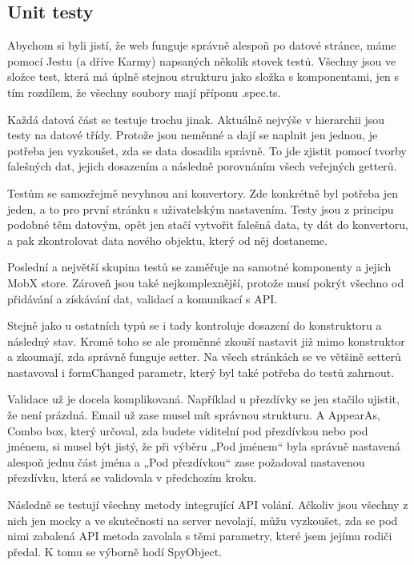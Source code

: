 \subsection{Unit testy}
Abychom si byli jistí, že web funguje správně alespoň po datové stránce, máme pomocí Jestu (a dříve Karmy) napsaných několik stovek testů. Všechny jsou ve složce test, která má úplně stejnou strukturu jako složka s komponentami, jen s tím rozdílem, že všechny soubory mají příponu .spec.ts.

Každá datová část se testuje trochu jinak. Aktuálně nejvýše v hierarchii jsou testy na datové třídy. Protože jsou neměnné a dají se naplnit jen jednou, je potřeba jen vyzkoušet, zda se data dosadila správně. To jde zjistit pomocí tvorby falešných dat, jejich dosazením a následně porovnáním všech veřejných getterů.

Testům se samozřejmě nevyhnou ani konvertory. Zde konkrétně byl potřeba jen jeden, a to pro první stránku s uživatelským nastavením. Testy jsou z principu podobné těm datovým, opět jen stačí vytvořit falešná data, ty dát do konvertoru, a pak zkontrolovat data nového objektu, který od něj dostaneme.

Poslední a největší skupina testů se zaměřuje na samotné komponenty a jejich MobX store. Zároveň jsou také nejkomplexnější, protože musí pokrýt všechno od přidávání a získávání dat, validací a komunikací s API.

Stejně jako u ostatních typů se i tady kontroluje dosazení do konstruktoru a následný stav. Kromě toho se ale proměnné zkouší nastavit již mimo konstruktor a zkoumají, zda správně funguje setter. Na všech stránkách se ve většině setterů nastavoval i formChanged parametr, který byl také potřeba do testů zahrnout.

Validace už je docela komplikovaná. Například u přezdívky se jen stačilo ujistit, že není prázdná. Email už zase musel mít správnou strukturu. A AppearAs, Combo box, který určoval, zda budete viditelní pod přezdívkou nebo pod jménem, si musel být jistý, že při výběru „Pod jménem“ byla správně nastavená alespoň jednu část jména a „Pod přezdívkou“ zase požadoval nastavenou přezdívku, která se validovala v předchozím kroku.

Následně se testují všechny metody integrující API volání. Ačkoliv jsou všechny z nich jen mocky a ve skutečnosti na server nevolají, můžu vyzkoušet, zda se pod nimi zabalená API metoda zavolala s těmi parametry, které jsem jejímu rodiči předal. K tomu se výborně hodí SpyObject.